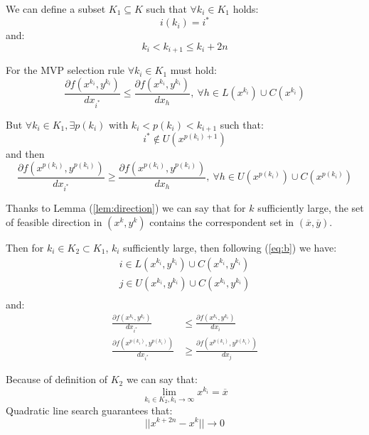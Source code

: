 We can define a subset $K_1 \subseteq K$ such that $\forall k_i \in K_1$ holds:
\begin{equation}
 i(k_i)=i^*
\end{equation}
and:
\begin{equation}
 k_i <k_{i+1} \le k_i+2n
\end{equation}


For the MVP selection rule $\forall k_i \in K_1$ must hold:
\begin{equation}
 \frac{\partial f(x^{k_i},y^{k_i})}{dx_{i^*}} \le \frac{\partial f(x^{k_i},y^{k_i})}{dx_{h}}, \ \forall h \in L(x^{k_i}) \cup C(x^{k_i})
\end{equation}

But  $\forall k_i \in K_1,\exists p(k_i)$ with  $k_i <p(k_i)<k_{i+1}$ such that:
\begin{equation}
 i^* \not \in U(x^{p(k_i)+1})
\end{equation}
and then
\begin{equation}
 \frac{\partial f(x^{p(k_i)},y^{p(k_i)})}{dx_{i^*}} \ge \frac{\partial f(x^{p(k_i)},y^{p(k_i)})}{dx_{h}}, \ \forall h \in U(x^{p(k_i)}) \cup C(x^{p(k_i)})
\end{equation}

Thanks to Lemma (\ref{lem:direction}) we can say that for $k$ sufficiently large, the set of feasible direction in $(x^k,y^k)$ contains the correspondent set in $(\overline{x},\overline{y})$.

Then for $k_i \in K_2 \subset K_1$, $k_i$ sufficiently large, then following (\ref{eq:b}) we have:
\begin{equation}
\begin{aligned}
i \in L(x^{k_i},y^{k_i}) \cup C(x^{k_i},y^{k_i})\\
j \in U(x^{k_i},y^{k_i}) \cup C(x^{k_i},y^{k_i})\\
\end{aligned}
\end{equation}
and:
\begin{equation}\label{eq:direction1}
\begin{aligned}
 \frac{\partial f(x^{k_i},y^{k_i})}{dx_{i^*}} &\le \frac{\partial f(x^{k_i},y^{k_i})}{dx_{i}}\\
 \frac{\partial f(x^{p(k_i)},y^{p(k_i)})}{dx_{i^*}} &\ge \frac{\partial f(x^{p(k_i)},y^{p(k_i)})}{dx_{j}}
 \end{aligned}
\end{equation}

Because of  definition of $K_2$ we can say that:
\begin{equation}
 \lim_{k_i \in K_2, k_i \rightarrow \infty} x^{k_i} =\overline{x}
\end{equation}
Quadratic line search guarantees that:
\begin{equation}
 ||x^{k+2n}-x^{k}|| \rightarrow 0
\end{equation}


